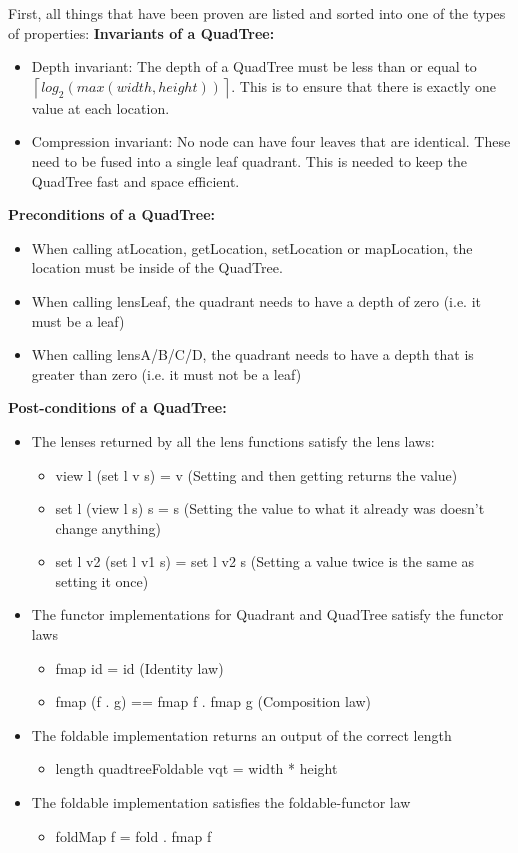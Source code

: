 First, all things that have been proven are listed and sorted into one of the types of properties: \linebreak 
\textbf{Invariants of a QuadTree:}
\begin{itemize}
    \item Depth invariant: The depth of a QuadTree must be less than or equal to $\left \lceil{log_{2}( max(width, height))}\right \rceil$. This is to ensure that there is exactly one value at each location.
    \item Compression invariant: No node can have four leaves that are identical. These need to be fused into a single leaf quadrant. This is needed to keep the QuadTree fast and space efficient.
\end{itemize} 
\textbf{Preconditions of a QuadTree:}
\begin{itemize}
    \item When calling atLocation, getLocation, setLocation or mapLocation, the location must be inside of the QuadTree.
    \item When calling lensLeaf, the quadrant needs to have a depth of zero (i.e.  it must be a leaf)
    \item When calling lensA/B/C/D, the quadrant needs to have a depth that is greater than zero (i.e.  it must not be a leaf)
\end{itemize} 
\textbf{Post-conditions of a QuadTree:}
\begin{itemize}
    \item The lenses returned by all the lens functions satisfy the lens laws: \cite{lens}
        \begin{itemize}
            \item view l (set l v s) = v (Setting and then getting returns the value)
            \item set l (view l s) s = s (Setting the value to what it already was doesn't change anything)
            \item set l v2 (set l v1 s) = set l v2 s (Setting a value twice is the same as setting it once)
        \end{itemize}
    \item The functor implementations for Quadrant and QuadTree satisfy the functor laws
        \begin{itemize}
            \item fmap id = id (Identity law)
            \item fmap (f . g) == fmap f . fmap g (Composition law)
        \end{itemize}
    \item The foldable implementation returns an output of the correct length
        \begin{itemize}
            \item length quadtreeFoldable vqt = width * height
        \end{itemize}
    \item The foldable implementation satisfies the foldable-functor law
        \begin{itemize}
            \item foldMap f = fold . fmap f
        \end{itemize}
\end{itemize}

